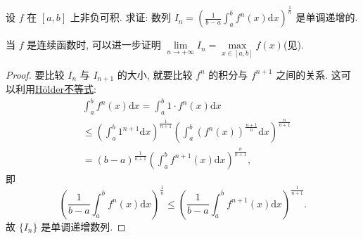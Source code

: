 \documentclass[../../main.tex]{subfiles}%
\begin{document}
\begin{example}
设 $f$ 在 $[a,b]$ 上非负可积. 求证: 数列 $I_n=\left(\frac{1}{b-a}\int_a^b f^n(x)\mathrm{d}x\right)^{\frac{1}{n}}$ 是单调递增的.
\end{example}
\begin{remark}
当 $f$ 是连续函数时, 可以进一步证明 $\lim\limits_{n\to+\infty}I_n=\max\limits_{x\in[a,b]}f(x)$(见).
\end{remark}
\begin{proof}

要比较 $I_n$ 与 $I_{n+1}$ 的大小, 就要比较 $f^n$ 的积分与 $f^{n+1}$ 之间的关系. 这可以利用\hyperref[theorem:Hölder(赫尔德)不等式(积分形式)]{Hölder不等式}:
$$
\begin{aligned}
&\int_a^b f^n(x)\mathrm{d}x = \int_a^b 1\cdot f^n(x)\mathrm{d}x \\
&\leqslant  \left(\int_a^b 1^{n+1}\mathrm{d}x\right)^{\frac{1}{n+1}} \left(\int_a^b (f^n(x))^{\frac{n+1}{n}}\mathrm{d}x\right)^{\frac{n}{n+1}} \\
&= (b-a)^{\frac{1}{n+1}} \left(\int_a^b f^{n+1}(x)\mathrm{d}x\right)^{\frac{n}{n+1}},
\end{aligned}
$$
即
$$\left(\frac{1}{b-a}\int_a^b f^n(x)\mathrm{d}x\right)^{\frac{1}{n}} \leqslant  \left(\frac{1}{b-a}\int_a^b f^{n+1}(x)\mathrm{d}x\right)^{\frac{1}{n+1}}.$$
故 $\{I_n\}$ 是单调递增数列.

\end{proof}
\end{document}
